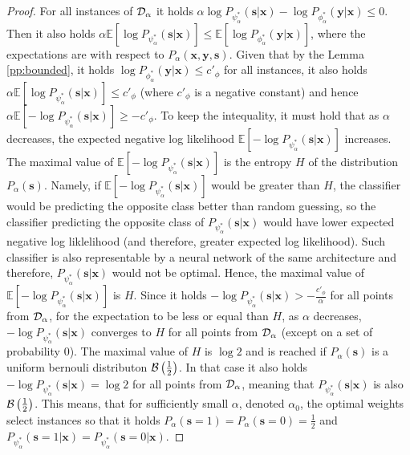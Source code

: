 \documentclass[preprint,12pt]{elsarticle}
\begin{document}
\begin{proof}
For all instances of ${\cal D}_\alpha$ it holds $\alpha\log P_{\psi^*_\alpha}(\mathbf{s}|\mathbf{x})-\log P_{\phi^*_\alpha}(\mathbf{y}|\mathbf{x})\leq 0$. Then it also holds
$\alpha\mathbb{E}[\log P_{\psi^*_\alpha}(\mathbf{s}|\mathbf{x})]\leq\mathbb{E}[\log P_{\phi^*_\alpha}(\mathbf{y}|\mathbf{x})]$, 
where the expectations are with respect to $P_\alpha(\mathbf{x},\mathbf{y},\mathbf{s})$.
Given that by the Lemma \ref{pp:bounded}, it holds $\log P_{\phi^*_\alpha}(\mathbf{y}|\mathbf{x})\leq c'_\phi$ for all instances, 
it also holds
$\alpha\mathbb{E}[\log P_{\psi^*_\alpha}(\mathbf{s}|\mathbf{x})]\leq c'_\phi$ (where $c'_\phi$ is a negative constant)
and hence $\alpha\mathbb{E}[-\log P_{\psi^*_\alpha}(\mathbf{s}|\mathbf{x})]\geq -c'_\phi$.
To keep the intequality, it must hold that as $\alpha$ decreases, the expected negative log likelihood $\mathbb{E}[-\log P_{\psi^*_\alpha}(\mathbf{s}|\mathbf{x})]$ increases. The maximal value of
$\mathbb{E}[-\log P_{\psi^*_\alpha}(\mathbf{s}|\mathbf{x})]$ is the entropy $H$ of the distribution $P_\alpha(\mathbf{s})$.
Namely, if $\mathbb{E}[-\log P_{\psi^*_\alpha}(\mathbf{s}|\mathbf{x})]$ would be greater than $H$,
the classifier would be predicting the opposite class better than random guessing, so the classifier predicting the opposite class of $P_{\psi^*_\alpha}(\mathbf{s}|\mathbf{x})$ would have lower expected negative log liklelihood (and therefore, greater expected log likelihood). Such classifier is also representable by a neural network of the same architecture and therefore, $P_{\psi^*_\alpha}(\mathbf{s}|\mathbf{x})$ would not be optimal. Hence, the maximal value of $\mathbb{E}[-\log P_{\psi^*_\alpha}(\mathbf{s}|\mathbf{x})]$ is $H$.
Since it holds $-\log P_{\psi^*_\alpha}(\mathbf{s}|\mathbf{x})>-\frac{c'_\phi}{\alpha}$ for all points from ${\cal D}_\alpha$, for the expectation to be less or equal than $H$, as $\alpha$ decreases, $-\log P_{\psi^*_\alpha}(\mathbf{s}|\mathbf{x})$ converges to $H$ for all points from ${\cal D}_\alpha$ (except on a set of probability $0$). The maximal value of $H$ is $\log2$ and is reached if $P_\alpha(\mathbf{s})$ is a uniform bernouli distributon ${\cal B}\left(\frac{1}{2}\right)$. In that case it also holds $-\log P_{\psi^*_\alpha}(\mathbf{s}|\mathbf{x})=\log 2$ for all points from ${\cal D}_\alpha$, meaning that $P_{\psi^*_\alpha}(\mathbf{s}|\mathbf{x})$ is also ${\cal B}\left(\frac{1}{2}\right)$. This means, that for sufficiently small $\alpha$, denoted $\alpha_0$, the optimal weights select instances so that it holds $P_\alpha(\mathbf{s}=1)=P_\alpha(\mathbf{s}=0)=\frac{1}{2}$ and $P_{\psi^*_\alpha}(\mathbf{s}=1|\mathbf{x})=P_{\psi^*_\alpha}(\mathbf{s}=0|\mathbf{x})$.


\end{proof}
\end{document}
